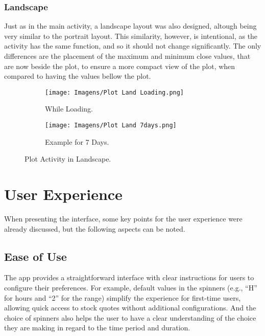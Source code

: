 \documentclass{article}
\begin{document}
\subsubsection{Landscape}
Just as in the main activity, a landscape layout was also designed, altough being very similar to the portrait layout.
This similarity, however, is intentional, as the activity has the same function, and so it should not change significantly.
The only differences are the placement of the maximum and minimum close values, that are now beside the plot, to ensure a more compact view of the plot, when compared to having the values bellow the plot.

\begin{figure}[ht]
    \centering
    \begin{subfigure}[t]{0.8\textwidth}
        \centering
        \texttt{[image: Imagens/Plot Land Loading.png]}
        \caption{While Loading.}
        \label{fig:plot land loading}
    \end{subfigure}
    
    \vspace{1em} 

    \begin{subfigure}[t]{0.8\textwidth} 
        \centering
        \texttt{[image: Imagens/Plot Land 7days.png]}
        \caption{Example for 7 Days.}
        \label{fig:plot land 7 days}
    \end{subfigure}

    \caption{Plot Activity in Landscape.}
    \label{fig:plot land}
\end{figure}

\clearpage
\section{User Experience}
When presenting the interface, some key points for the user experience were already discussed, but the following aspects can be noted.

\subsection{Ease of Use}
The app provides a straightforward interface with clear instructions for users to configure their preferences.
For example, default values in the spinners (e.g., “H” for hours and “2” for the range) simplify the experience for first-time users, allowing quick access to stock quotes without additional configurations.
And the choice of spinners also helps the user to have a clear understanding of the choice they are making in regard to the time period and duration.
\end{document}
